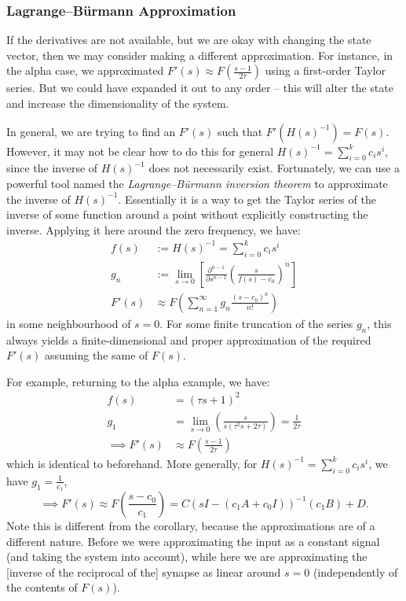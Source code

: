 \subsubsection{Lagrange--B\"urmann Approximation}

If the derivatives are not available, but we are okay with changing the state vector, then we may consider making a different approximation.
For instance, in the alpha case, we approximated $F'(s) \approx F \left( \frac{s-1}{2\tau} \right)$ using a first-order Taylor series.
But we could have expanded it out to any order -- this will alter the state and increase the dimensionality of the system.

In general, we are trying to find an $F'(s)$ such that $F'(H(s)^{-1}) = F(s)$.
However, it may not be clear how to do this for general $H(s)^{-1} = \sum_{i=0}^k c_i s^i$, since the inverse of $H(s)^{-1}$ does not necessarily exist.
Fortunately, we can use a powerful tool named the {\it Lagrange--B\"urmann inversion theorem} to approximate the inverse of $H(s)^{-1}$.
Essentially it is a way to get the Taylor series of the inverse of some function around a point without explicitly constructing the inverse. Applying it here around the zero frequency, we have:
\begin{align}
f(s) &:= H(s)^{-1} = \sum_{i=0}^k c_i s^i \nonumber \\
g_n &:= \lim_{s \rightarrow 0} \left[ \frac{\partial^{n-1}}{\partial s^{n-1}} \left( \frac{s}{f(s) - c_0} \right)^n \right] \nonumber \\
F'(s) &\approx F \left( \sum_{n=1}^\infty g_n \frac{(s - c_0)^n}{n!} \right)
\end{align}
in some neighbourhood of $s = 0$.
For some finite truncation of the series $g_n$, this always yields a finite-dimensional and proper approximation of the required $F'(s)$ assuming the same of $F(s)$.

For example, returning to the alpha example, we have:
\begin{align*}
f(s) &= (\tau s + 1)^2 \\
g_1 &= \lim_{s \rightarrow 0} \left( \frac{s}{ s(\tau^2 s + 2 \tau)} \right) = \frac{1}{2 \tau} \\
\implies F'(s) &\approx F \left( \frac{s - 1}{2\tau} \right)
\end{align*}
which is identical to beforehand.
More generally, for $H(s)^{-1} = \sum_{i=0}^k c_i s^i$, we have $g_1 = \frac{1}{c_1}$,
\begin{equation}
\implies F'(s) \approx F \left( \frac{s - c_0}{c_1} \right) = C \left( sI - (c_1 A + c_0 I) \right)^{-1} (c_1 B) + D.
\end{equation}
Note this is different from the corollary, because the approximations are of a different nature. Before we were approximating the input as a constant signal (and taking the system into account), while here we are approximating the [inverse of the reciprocal of the] synapse as linear around $s = 0$ (independently of the contents of $F(s)$).

